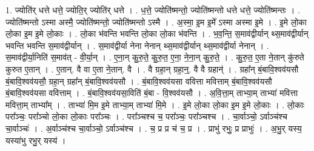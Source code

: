 \documentclass[17pt]{extarticle}
\begin{document}
1. ज्योति॑र् धत्ते धत्ते॒ ज्योति॒र् ज्योति॑र् धत्ते । . ध॒त्ते॒ ज्योति॑ष्मन्तो॒ ज्योति॑ष्मन्तो धत्ते धत्ते॒ ज्योति॑ष्मन्तः । . ज्योति॑ष्मन्तो ऽस्मा अस्मै॒ ज्योति॑ष्मन्तो॒ ज्योति॑ष्मन्तो ऽस्मै । . अ॒स्मा॒ इ॒म इ॒मे᳚ ऽस्मा अस्मा इ॒मे । . इ॒मे लो॒का लो॒का इ॒म इ॒मे लो॒काः । . लो॒का भ॑वन्ति भवन्ति लो॒का लो॒का भ॑वन्ति । . भ॒व॒न्ति॒ स॒माव॑द्वीर्यान् थ्स॒माव॑द्वीर्यान् भवन्ति भवन्ति स॒माव॑द्वीर्यान् । . स॒माव॑द्वीर्या नेना नेनान् थ्स॒माव॑द्वीर्यान् थ्स॒माव॑द्वीर्या नेनान् । . स॒माव॑द्वीर्या॒निति॑ स॒माव॑त् - वी॒र्या॒न् । . ए॒ना॒न् कु॒रु॒ते॒ कु॒रु॒त॒ ए॒ना॒ ने॒ना॒न् कु॒रु॒ते॒ । . कु॒रु॒त॒ ए॒ता ने॒तान् कु॑रुते कुरुत ए॒तान् । . ए॒तान्. वै वा ए॒ता ने॒तान्. वै । . वै ग्रहा॒न् ग्रहा॒न्॒. वै वै ग्रहान्॑ । . ग्रहा᳚न् बं॒बावि॒श्वव॑यसौ बं॒बावि॒श्वव॑यसौ॒ ग्रहा॒न् ग्रहा᳚न् बं॒बावि॒श्वव॑यसौ । . बं॒बावि॒श्वव॑यसा ववित्ता मवित्ताम् बं॒बावि॒श्वव॑यसौ बं॒बावि॒श्वव॑यसा ववित्ताम् । . बं॒बावि॒श्वव॑यसा॒विति॑ बं॒बा - वि॒श्वव॑यसौ । . अ॒वि॒त्ता॒म् ताभ्या॒म् ताभ्या॑ मवित्ता मवित्ता॒म् ताभ्या᳚म् । . ताभ्या॑ मि॒म इ॒मे ताभ्या॒म् ताभ्या॑ मि॒मे । . इ॒मे लो॒का लो॒का इ॒म इ॒मे लो॒काः । . लो॒काः परा᳚ञ्चः॒ परा᳚ञ्चो लो॒का लो॒काः परा᳚ञ्चः । . परा᳚ञ्चश्च च॒ परा᳚ञ्चः॒ परा᳚ञ्चश्च । . चा॒र्वाञ्चो॒ ऽर्वाञ्च॑श्च चा॒र्वाञ्चः॑ । . अ॒र्वाञ्च॑श्च चा॒र्वाञ्चो॒ ऽर्वाञ्च॑श्च । . च॒ प्र प्र च॑ च॒ प्र । . प्राभु॑ रभुः॒ प्र प्राभुः॑ । . अ॒भु॒र् यस्य॒ यस्या॑भु रभु॒र् यस्य॑ । \newline
\end{document}

